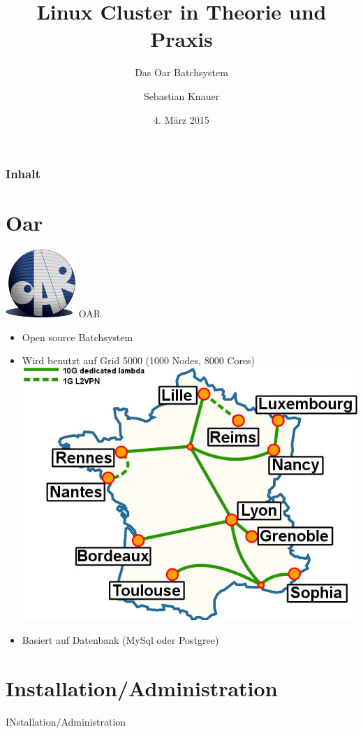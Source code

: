 \documentclass[10pt,utf8]{beamer}
\title{Linux Cluster in Theorie und Praxis}
\subtitle{Das Oar Batchsystem}
\author{Sebastian Knauer}
\date{4. M\"arz 2015}
\institute[ZIH TUD]{Zentrum f\"ur Informationsdienste und Hochleistungsrechnen -- TU Dresden}
\begin{document}
\zihmaketitle

\begin{frame}
\frametitle{Inhalt}
	\tableofcontents
\end{frame}

\section{Oar}
\begin{frame}{\includegraphics[scale=0.22, keepaspectratio]{oar-logo.png}  OAR}
    \begin{itemize}
        \item{Open source Batchsystem}
        \item{Wird benutzt auf Grid 5000 (1000 Nodes, 8000 Cores)
	        \includegraphics[scale=1.0, keepaspectratio]{grid5000.jpg}
            }
        \item{Basiert auf Datenbank (MySql oder Postgree) }
    \end{itemize}
\end{frame}

\section{Installation/Administration}
\begin{frame}{INstallation/Administration}
\end{frame}
\end{document}
